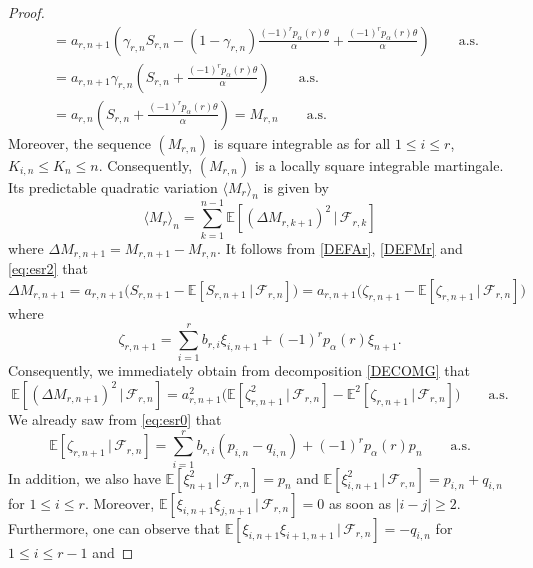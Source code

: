 \documentclass[10pt,a4paper]{amsart}
\newcommand{\E}{\mathds{E}}
\begin{document}
\begin{proof}
\begin{align*}
&=a_{r,n+1}\left(\gamma_{r,n}S_{r,n}-(1-\gamma_{r,n})\frac{(-1)^{r}p_{\alpha}(r) \theta}{\alpha}+\frac{(-1)^{r} p_{\alpha}(r) \theta}{\alpha}\right) \qquad \text{a.s.}\\
&=a_{r,n+1}\gamma_{r,n} \left(S_{r,n}+\frac{(-1)^{r} p_{\alpha}(r) \theta}{\alpha}\right)  \qquad \text{a.s.}\\
&=a_{r,n} \left(S_{r,n}+\frac{(-1)^{r} p_{\alpha}(r) \theta}{\alpha}\right)= M_{r,n} \qquad \text{a.s.}
\end{align*}
Moreover, the sequence $(M_{r,n})$ is square integrable as for all $1 \leq i \leq r$, $K_{i,n}\leq K_n \leq n$. Consequently, $(M_{r,n})$ is a locally square
integrable martingale. Its predictable quadratic variation $\langle M_r \rangle_{n}$ is given by
\begin{equation}
\label{eq:CVMr1}
\langle M_r \rangle_{n} = \sum_{k=1}^{n-1} \E[(\Delta  M_{r,k+1})^{2}\,|\,\mathcal{F}_{r,k}]
\end{equation}
where $\Delta M_{r,n+1}=M_{r,n+1}-M_{r,n}$. It follows from \eqref{DEFAr}, \eqref{DEFMr} and \eqref{eq:esr2} that
\begin{equation}
\label{DECOMG}
\Delta M_{r,n+1}= a_{r,n+1} \Big( S_{r,n+1} - \E[S_{r,n+1}\,|\,\mathcal{F}_{r,n}]\Big)=a_{r,n+1} \Big( \zeta_{r,n+1} - \E[\zeta_{r,n+1}\,|\,\mathcal{F}_{r,n}]\Big)
\end{equation}
where
\begin{equation*}
\zeta_{r,n+1}= \sum_{i=1}^{r}b_{r,i}\xi_{i,n+1}+(-1)^r p_{\alpha}(r) \xi_{n+1}.
\end{equation*}
Consequently, we immediately obtain from decomposition \eqref{DECOMG} that
\begin{equation}
\label{eq:CVMr2}
\E[(\Delta M_{r,n+1})^{2}\,|\,\mathcal{F}_{r,n}]=a_{r,n+1}^{2}\Big(\E[\zeta_{r,n+1}^{2}\,|\,\mathcal{F}_{r,n}]-\E^2[\zeta_{r,n+1}\,|\,\mathcal{F}_{r,n}]\Big) \qquad \text{a.s.}
\end{equation}
We already saw from \eqref{eq:esr0} that
\begin{equation}
\label{CEzeta1}
\E[\zeta_{r,n+1}\,|\,\mathcal{F}_{r,n}]= \sum_{i=1}^{r}b_{r,i}(p_{i,n}-q_{i,n}) + (-1)^rp_{\alpha}(r) p_{n} \qquad \text{a.s.}
\end{equation}
In addition, we also have $\E[\xi_{n+1}^2\,|\,\mathcal{F}_{r,n}]=p_n$ and $\E[\xi_{i,n+1}^2\,|\,\mathcal{F}_{r,n}]=p_{i,n}+q_{i,n}$ for $1 \leq i \leq r$.
Moreover, $\E[\xi_{i,n+1} \xi_{j,n+1}\,|\,\mathcal{F}_{r,n}]=0$ as soon as $|i-j| \geq 2$. Furthermore, one can observe that $\E[\xi_{i,n+1} \xi_{i+1,n+1}\,|\,\mathcal{F}_{r,n}]=-q_{i, n}$ for $1 \leq i \leq r-1$ and

\end{proof}
\end{document}
